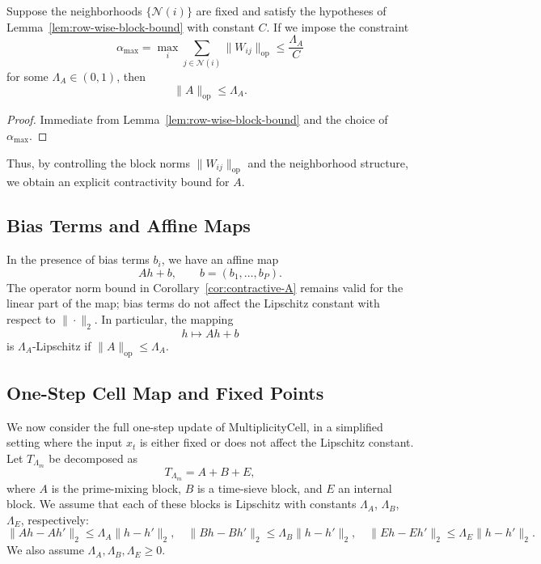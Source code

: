 \documentclass[11pt]{article}
\begin{document}
\begin{corollary}
\label{cor:contractive-A}
Suppose the neighborhoods \(\{\mathcal{N}(i)\}\) are fixed and satisfy the
hypotheses of Lemma~\ref{lem:row-wise-block-bound} with constant \(C\). If we
impose the constraint
\[
  \alpha_{\max}
  =
  \max_i \sum_{j\in\mathcal{N}(i)} \|W_{ij}\|_{\mathrm{op}}
  \le \frac{\Lambda_A}{C}
\]
for some \(\Lambda_A \in (0,1)\), then
\[
  \|A\|_{\mathrm{op}} \le \Lambda_A.
\]
\end{corollary}

\begin{proof}
Immediate from Lemma~\ref{lem:row-wise-block-bound} and the choice of
\(\alpha_{\max}\).
\end{proof}

Thus, by controlling the block norms \(\|W_{ij}\|_{\mathrm{op}}\) and the
neighborhood structure, we obtain an explicit contractivity bound for \(A\).

\subsection{Bias Terms and Affine Maps}

In the presence of bias terms \(b_i\), we have an affine map
\[
  A h + b,
  \qquad
  b = (b_1,\dots,b_P).
\]
The operator norm bound in Corollary~\ref{cor:contractive-A} remains valid for
the linear part of the map; bias terms do not affect the Lipschitz constant
with respect to \(\|\cdot\|_2\). In particular, the mapping
\[
  h \mapsto A h + b
\]
is \(\Lambda_A\)-Lipschitz if \(\|A\|_{\mathrm{op}} \le \Lambda_A\).

\subsection{One-Step Cell Map and Fixed Points}

We now consider the full one-step update of MultiplicityCell, in a simplified
setting where the input \(x_t\) is either fixed or does not affect the
Lipschitz constant. Let \(T_{\Lambda_m}\) be decomposed as
\[
  T_{\Lambda_m}
  =
  A + B + E,
\]
where \(A\) is the prime-mixing block, \(B\) is a time-sieve block, and \(E\)
an internal block. We assume that each of these blocks is Lipschitz with
constants \(\Lambda_A\), \(\Lambda_B\), \(\Lambda_E\), respectively:
\[
  \|A h - A h'\|_2 \le \Lambda_A \|h - h'\|_2, \quad
  \|B h - B h'\|_2 \le \Lambda_B \|h - h'\|_2, \quad
  \|E h - E h'\|_2 \le \Lambda_E \|h - h'\|_2.
\]
We also assume \(\Lambda_A,\Lambda_B,\Lambda_E \ge 0\).
\end{document}
